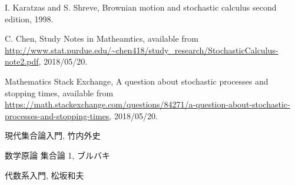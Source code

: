 \begin{thebibliography}{数字}
	 I. Karatzas and S. Shreve, Brownian motion and stochastic calculus second edition, 1998.
	
	 C. Chen, Study Notes in Matheamtics, available from \url{http://www.stat.purdue.edu/~chen418/study_research/StochasticCalculus-note2.pdf}, 2018/05/20.

	 Mathematics Stack Exchange, A question about stochastic processes and stopping times, available from \url{https://math.stackexchange.com/questions/84271/a-question-about-stochastic-processes-and-stopping-times}, 2018/05/20.
	
	 現代集合論入門, 竹内外史
	
	 数学原論 集合論 1, ブルバキ
	
	 代数系入門, 松坂和夫
\end{thebibliography}